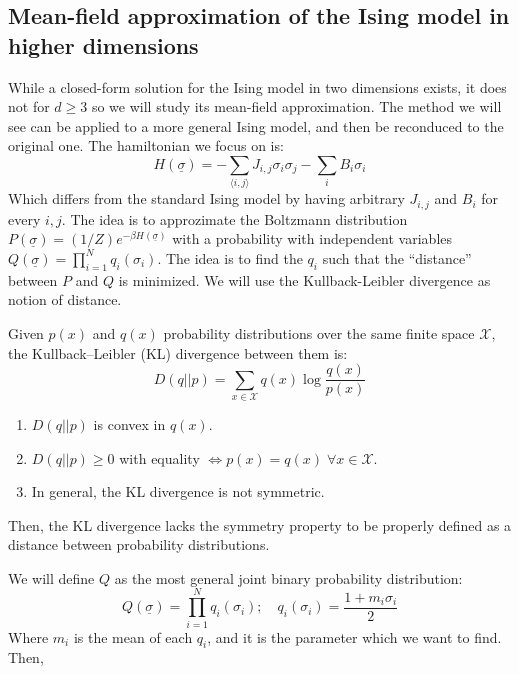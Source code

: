 \subsection{Mean-field approximation of the Ising model in higher dimensions}
While a closed-form solution for the Ising model in two dimensions exists, it does not for $d\geq 3$ so we will study its mean-field approximation. The method we will see can be applied to a more general Ising model, and then be reconduced to the original one. The hamiltonian we focus on is:
\begin{equation}
    H(\underline{\sigma}) = -\sum_{\langle i,j\rangle}J_{i,j}\sigma_i\sigma_j - \sum_i B_i\sigma_i
\end{equation}
Which differs from the standard Ising model by having arbitrary $J_{i,j}$ and $B_i$ for every $i,j$. The idea is to approzimate the Boltzmann distribution $P(\underline{\sigma}) = (1/Z)e^{-\beta H(\underline{\sigma})}$ with a probability with independent variables $Q(\underline{\sigma})= \prod_{i=1}^Nq_i(\sigma_i)$. The idea is to find the $q_i$ such that the ``distance'' between $P$ and $Q$ is minimized. We will use the Kullback-Leibler divergence as notion of distance.
\begin{definition}
    Given $p(x)$ and $q(x)$ probability distributions over the same finite space $\mathcal{X}$, the Kullback–Leibler (KL) divergence between them is:
    $$D(q||p) = \sum_{x\in\mathcal{X}}q(x)\log\frac{q(x)}{p(x)}$$
\end{definition}
\begin{remark}
    \hfill
    \begin{enumerate}
        \item $D(q||p)$ is convex in $q(x)$.
        \item $D(q||p)\geq 0$ with equality $ \iff p(x)=q(x) \;\forall x\in\mathcal{X}$.
        \item In general, the KL divergence is not symmetric.
    \end{enumerate}
    Then, the KL divergence lacks the symmetry property to be properly defined as a distance between probability distributions.
\end{remark}
We will define $Q$ as the most general joint binary probability distribution:
\begin{equation}
    Q(\underline{\sigma}) = \prod_{i=1}^{N}q_i(\sigma_i); \quad
    q_i(\sigma_i)=\frac{1+m_i\sigma_i}{2}
\end{equation}
Where $m_i$ is the mean of each $q_i$, and it is the parameter which we want to find. Then,
